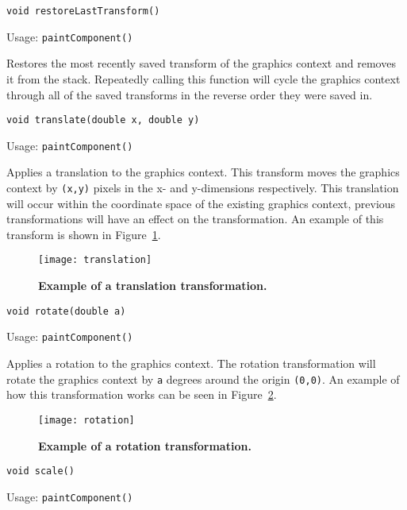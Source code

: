 \documentclass[a4paper, 10pt]{report}
\begin{document}
{\large {\tt void restoreLastTransform()}}

Usage: {\tt paintComponent()}

Restores the most recently saved transform of the graphics context and removes it from the stack. Repeatedly calling this function will cycle the graphics context through all of the saved transforms in the reverse order they were saved in.

\hrulefill

{\large {\tt void translate(double x, double y)}}

Usage: {\tt paintComponent()}

Applies a translation to the graphics context. This transform moves the graphics context by {\tt (x,y)} pixels in the x- and y-dimensions respectively. This translation will occur within the coordinate space of the existing graphics context, previous transformations will have an effect on the transformation. An example of this transform is shown in Figure~\ref{fig:Translate}.

\begin{figure}[htbp]
\begin{center}
\texttt{[image: translation]}
\caption{{\bf Example of a translation transformation.}}
\label{fig:Translate}
\end{center}
\end{figure}

\hrulefill

{\large {\tt void rotate(double a)}}

Usage: {\tt paintComponent()}

Applies a rotation to the graphics context. The rotation transformation will rotate the graphics context by {\tt a} degrees around the origin {\tt (0,0)}. An example of how this transformation works can be seen in Figure~\ref{fig:Rotate}.

\begin{figure}[htbp]
\begin{center}
\texttt{[image: rotation]}
\caption{{\bf Example of a rotation transformation.}}
\label{fig:Rotate}
\end{center}
\end{figure}

\hrulefill

{\large {\tt void scale()}}

Usage: {\tt paintComponent()}
\end{document}
